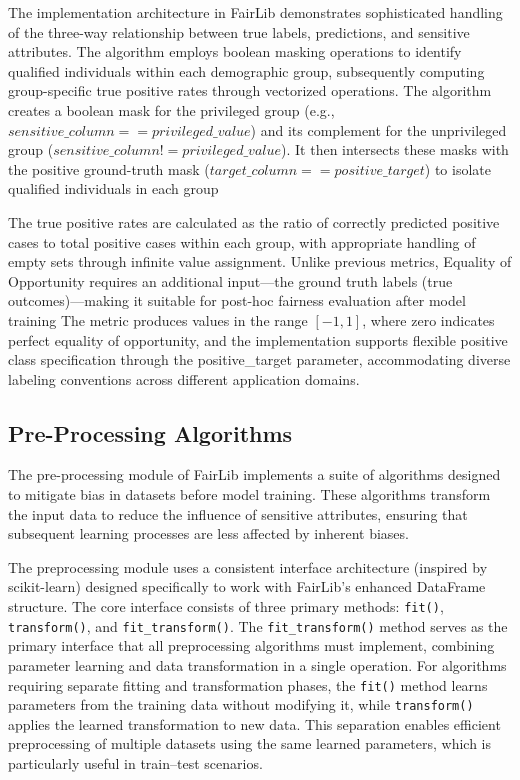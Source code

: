 \documentclass[12pt,a4paper,openright,twoside]{book}
\begin{document}
The implementation architecture in FairLib demonstrates sophisticated handling of the three-way relationship between true labels, predictions, and sensitive attributes. The algorithm employs boolean masking operations to identify qualified individuals within each demographic group, subsequently computing group-specific true positive rates through vectorized operations. The algorithm creates a boolean mask for the privileged group (e.g., $sensitive\_column == privileged\_value$) and its complement for the unprivileged group ($sensitive\_column != privileged\_value$). It then intersects these masks with the positive ground-truth mask ($target\_column == positive\_target$) to isolate qualified individuals in each group

The true positive rates are calculated as the ratio of correctly predicted positive cases to total positive cases within each group, with appropriate handling of empty sets through infinite value assignment. Unlike previous metrics, Equality of Opportunity requires an additional input—the ground truth labels (true outcomes)—making it suitable for post-hoc fairness evaluation after model training The metric produces values in the range $[-1, 1]$, where zero indicates perfect equality of opportunity, and the implementation supports flexible positive class specification through the positive\_target parameter, accommodating diverse labeling conventions across different application domains.

\subsection{Pre-Processing Algorithms}
The pre-processing module of FairLib implements a suite of algorithms designed to mitigate bias in datasets before model training. These algorithms transform the input data to reduce the influence of sensitive attributes, ensuring that subsequent learning processes are less affected by inherent biases.

The preprocessing module uses a consistent interface architecture (inspired by scikit-learn) designed specifically to work with FairLib’s enhanced DataFrame structure. The core interface consists of three primary methods: \texttt{fit()}, \texttt{transform()}, and \texttt{fit\_transform()}. The \texttt{fit\_transform()} method serves as the primary interface that all preprocessing algorithms must implement, combining parameter learning and data transformation in a single operation. For algorithms requiring separate fitting and transformation phases, the \texttt{fit()} method learns parameters from the training data without modifying it, while \texttt{transform()} applies the learned transformation to new data. This separation enables efficient preprocessing of multiple datasets using the same learned parameters, which is particularly useful in train–test scenarios.
\end{document}

